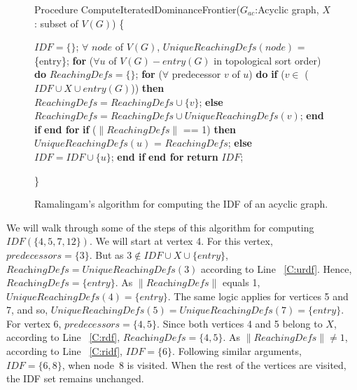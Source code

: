 {\begin{figure}[!ht]
\begin{minipage}[t]{5in}
    Procedure ComputeIteratedDominanceFrontier($G_{ac}$:Acyclic graph, $X$: subset of $V(G)$)
    \{
    \begin{code}

     $IDF = \{\}$; 
     $\forall$ $node$ of $V(G)$, $UniqueReachingDefs(node)$ = \{entry\};
     {\bf for} ($\forall u$ of $V(G) - entry(G)$ in topological sort order) {\bf do}
        $ReachingDefs = \{\}$; 
        {\bf for} ($\forall$ predecessor $v$ of $u$) {\bf do}
          {\bf if} ($v \in$ ($IDF \cup X \cup entry(G)$)) {\bf then} 
             $ReachingDefs = ReachingDefs \cup \{v\}$; \label{C:rdf}
          {\bf else} 
             $ReachingDefs = ReachingDefs \cup UniqueReachingDefs(v)$; \label{C:urdf}
          {\bf end if} 
       {\bf end for} 
       {\bf if} ($\|ReachingDefs\|$ == 1) {\bf then} \label{C:onerd}
          $UniqueReachingDefs(u)$ = $ReachingDefs$; 
       {\bf else} 
           $IDF = IDF \cup \{u\}$; \label{C:ridf}
       {\bf end if}    
     {\bf end for} 
     {\bf return} $IDF$;   
     
    \end{code}
    \}
 
  \end{minipage}
  \caption{Ramalingam's algorithm for computing the IDF of an acyclic graph.}
  \label{F:ramaIDF}
  \end{figure}

    We will walk through some of the steps of this algorithm for computing $IDF(\{4,5,7,12\})$. We will start at vertex 4. For this vertex, $\textit{predecessors} = \{3\}$. But as $3 \notin IDF \cup X \cup \{entry\}$, $\textit{ReachingDefs} = \textit{UniqueReachingDefs}(3)$ according to Line ~\ref{C:urdf}. Hence, 
$\textit{ReachingDefs} = \{entry\}$. As $\|\textit{ReachingDefs}\|$ equals 1, $\textit{UniqueReachingDefs}(4) = \{entry\}$. The same logic applies for vertices 5 and 7, and so,  $\textit{UniqueReachingDefs}(5) = \textit{UniqueReachingDefs}(7) = \{entry\}$.
    For vertex 6, $\textit{predecessors} = \{4,5\}$.
    Since both vertices 4 and 5 belong to $X$, according to Line ~\ref{C:rdf}, 
    $\textit{ReachingDefs} = \{4,5\}$.
    As $\|\textit{ReachingDefs}\| \neq 1$, according to Line ~\ref{C:ridf}, $IDF = \{6\}$.
    Following similar arguments, $IDF = \{6,8\}$, when node~8 is visited. When the rest of the vertices
    are visited, the IDF set remains unchanged. 

}
